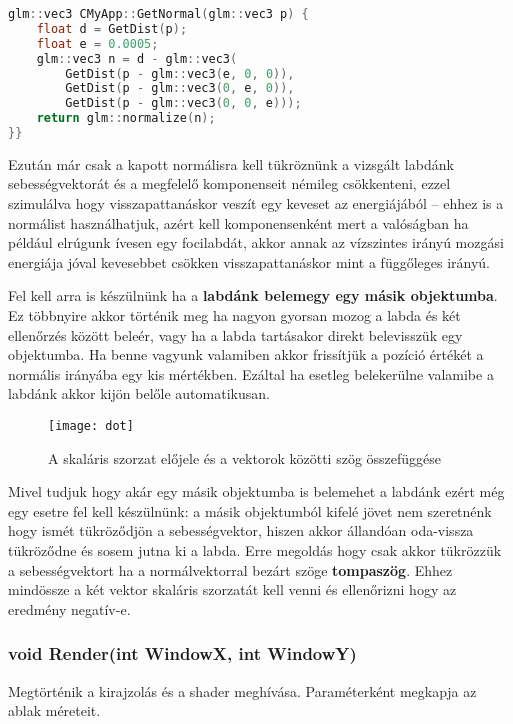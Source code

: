 \begin{lstlisting}[language={C++}]
glm::vec3 CMyApp::GetNormal(glm::vec3 p) {
	float d = GetDist(p);
	float e = 0.0005;
	glm::vec3 n = d - glm::vec3(
		GetDist(p - glm::vec3(e, 0, 0)),
		GetDist(p - glm::vec3(0, e, 0)),
		GetDist(p - glm::vec3(0, 0, e)));
	return glm::normalize(n);
}}
\end{lstlisting}

Ezután már csak a kapott normálisra kell tükröznünk a vizsgált labdánk sebességvektorát és a megfelelő komponenseit némileg csökkenteni, ezzel szimulálva hogy visszapattanáskor veszít egy keveset az energiájából -- ehhez is a normálist használhatjuk, azért kell komponensenként mert a valóságban ha például elrúgunk ívesen egy focilabdát, akkor annak az vízszintes irányú mozgási energiája jóval kevesebbet csökken visszapattanáskor mint a függőleges irányú. 

Fel kell arra is készülnünk ha a \textbf{labdánk belemegy egy másik objektumba}. Ez többnyire akkor történik meg ha nagyon gyorsan mozog a labda és két ellenőrzés között beleér, vagy ha a labda tartásakor direkt belevisszük egy objektumba. Ha benne vagyunk valamiben akkor frissítjük a pozíció értékét a normális irányába egy kis mértékben.  Ezáltal ha esetleg belekerülne valamibe a labdánk akkor kijön belőle automatikusan.

\begin{figure}[H]
	\centering
	\texttt{[image: dot]}
	\caption{A skaláris szorzat előjele és a vektorok közötti szög összefüggése \cite{13DotPro79:online}}
	\label{fig:dot}
\end{figure}

Mivel tudjuk hogy akár egy másik objektumba is belemehet a labdánk ezért még egy esetre fel kell készülnünk: a másik objektumból kifelé jövet nem szeretnénk hogy ismét tükröződjön a sebességvektor, hiszen akkor állandóan oda-vissza tükröződne és sosem jutna ki a labda. Erre megoldás hogy csak akkor tükrözzük a sebességvektort ha a normálvektorral bezárt szöge \textbf{tompaszög}. Ehhez mindössze a két vektor skaláris szorzatát kell venni és ellenőrizni hogy az eredmény negatív-e.

 
\subsubsection{void Render(int WindowX, int WindowY)} 

Megtörténik a kirajzolás és a shader meghívása. Paraméterként megkapja az ablak méreteit. 


